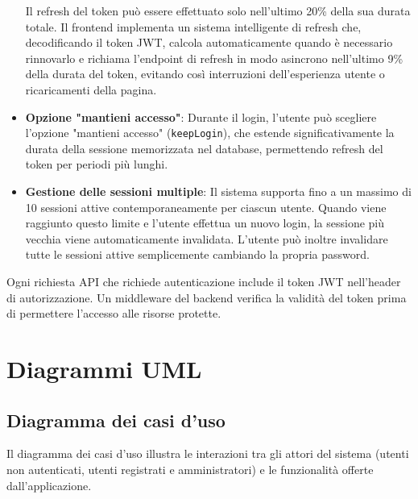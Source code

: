 \documentclass[11pt]{article}
\begin{document}
\begin{itemize}
    Il refresh del token può essere effettuato solo nell'ultimo 20\% della sua durata totale. Il frontend implementa un sistema intelligente di refresh che, decodificando il token JWT, calcola automaticamente quando è necessario rinnovarlo e richiama l'endpoint di refresh in modo asincrono nell'ultimo 9\% della durata del token, evitando così interruzioni dell'esperienza utente o ricaricamenti della pagina.

    \item \textbf{Opzione "mantieni accesso"}: Durante il login, l'utente può scegliere l'opzione "mantieni accesso" (\texttt{keepLogin}), che estende significativamente la durata della sessione memorizzata nel database, permettendo refresh del token per periodi più lunghi.

    \item \textbf{Gestione delle sessioni multiple}: Il sistema supporta fino a un massimo di 10 sessioni attive contemporaneamente per ciascun utente. Quando viene raggiunto questo limite e l'utente effettua un nuovo login, la sessione più vecchia viene automaticamente invalidata. L'utente può inoltre invalidare tutte le sessioni attive semplicemente cambiando la propria password.
\end{itemize}

Ogni richiesta API che richiede autenticazione include il token JWT nell'header di autorizzazione. Un middleware del backend verifica la validità del token prima di permettere l'accesso alle risorse protette.

\section{Diagrammi UML}

\subsection{Diagramma dei casi d'uso}
Il diagramma dei casi d'uso illustra le interazioni tra gli attori del sistema (utenti non autenticati, utenti registrati e amministratori) e le funzionalità offerte dall'applicazione.
\end{document}
